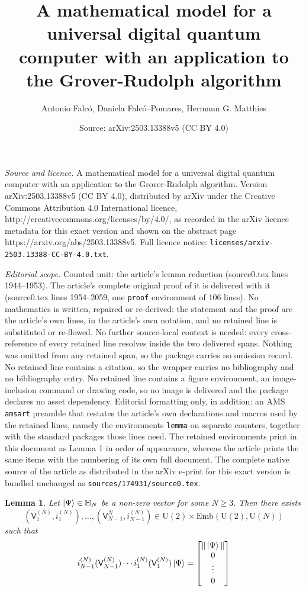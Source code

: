 \documentclass[10pt,a4paper]{amsart}
\title{A mathematical model for a universal digital quantum computer with an application to the Grover-Rudolph algorithm}
\author{Antonio Falc\'o, Daniela Falc\'o--Pomares, Hermann G. Matthies}
\date{Source: arXiv:2503.13388v5 (CC BY 4.0)}
\newtheorem{lemma}{Lemma}
\newcommand{\rV}{\mathsf{V}}
\begin{document}
\maketitle

\noindent\emph{Source and licence.} A mathematical model for a universal digital quantum computer with an application to the Grover-Rudolph algorithm. Version arXiv:2503.13388v5 (CC BY 4.0), distributed by arXiv under the Creative Commons Attribution 4.0 International licence, http://creativecommons.org/licenses/by/4.0/, as recorded in the arXiv licence metadata for this exact version and shown on the abstract page https://arxiv.org/abs/2503.13388v5. Full licence notice: \texttt{licenses/arxiv-2503.13388-CC-BY-4.0.txt}.\par\smallskip

\noindent\textit{Editorial scope.} Counted unit: the article's lemma reduction (source0.tex lines 1944--1953). The article's complete original proof of it is delivered with it (source0.tex lines 1954--2059, one \texttt{proof} environment of 106 lines). No mathematics is written, repaired or re-derived: the statement and the proof are the article's own lines, in the article's own notation, and no retained line is substituted or re-flowed.  No further source-local context is needed: every cross-reference of every retained line resolves inside the two delivered spans.  Nothing was omitted from any retained span, so the package carries no omission record.  No retained line contains a citation, so the wrapper carries no bibliography and no bibliography entry.  No retained line contains a figure environment, an image-inclusion command or drawing code, so no image is delivered and the package declares no asset dependency.  Editorial formatting only, in addition: an AMS \texttt{amsart} preamble that restates the article's own declarations and macros used by the retained lines, namely the environments \texttt{lemma} on separate counters, together with the standard packages those lines need.  The retained environments print in this document as Lemma 1 in order of appearance, whereas the article prints the same items with the numbering of its own full document.  The complete native source of the article as distributed in the arXiv e-print for this exact version is bundled unchanged as \texttt{sources/174931/source0.tex}.
    \begin{lemma}\label{reduction}
      Let $\ket{\Psi} \in \mathbb{H}_N$ be a non-zero vector for some $N\ge 3.$ Then there exists 
      $$
      (\rV_1^{(N)},i_1^{(N)}),\ldots,(\rV_{N-1}^{N},i_{N-1}^{(N)}) \in \mathrm{U}(2)  \times \mathrm{Emb}(\mathrm{U}(2),\mathrm{U}(N))
      $$ 
      such that
      $$
      i_{N-1}^{(N)}(\rV_{N-1}^{(N)}) \cdots i_1^{(N)}(\rV_1^{(N)}) \ket{\Psi} =  \begin{bmatrix} \|\ket{\Psi}\| \\ 0 \\ \vdots  \\ 0 \end{bmatrix}
      $$
      \end{lemma}
\end{document}
